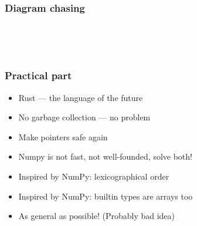 \documentclass[xetex,mathserif,serif]{beamer}
\newcommand\Nat{\mathbb{N}}
\begin{document}
\begin{frame}
  \frametitle{Diagram chasing}
  \begin{center}
    \\[1em]

    \\[1em]

  \end{center}




\end{frame}

\begin{frame}
  \frametitle{Practical part}
  \begin{itemize}%
    \item Rust --- the language of the future
    \item No garbage collection --- no problem
    \item Make pointers safe again
    \item Numpy is not fast, not well-founded, solve both!
    \item Inspired by NumPy: lexicographical order
    \item Inspired by NumPy: builtin types are arrays too
    \item As general as possible! (Probably bad idea)
  \end{itemize}
\end{frame}
\end{document}
